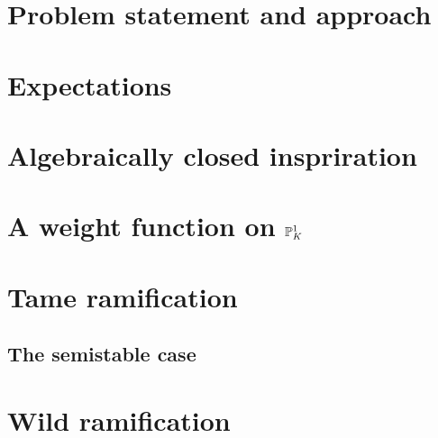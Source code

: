\section{Problem statement and approach} \label{sec:problem_statement}


\section{Expectations} \label{sec:expectations}


\section{Algebraically closed inspriration} \label{sec:algebraically_closed_inspriration}


\section{A weight function on $\mathbb{P}^{1}_K$} \label{sec:a_weight_function_on_pro^{1}_k}



\section{Tame ramification} \label{sec:if_mk}

\subsection{The semistable case} \label{sec:the_semistable_case}




\section{Wild ramification} \label{sec:wild_ramification}



